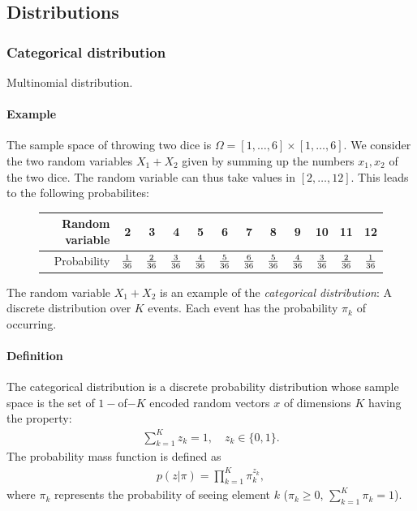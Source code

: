 \subsection{Distributions}
\subsubsection{Categorical distribution}
Multinomial distribution.
\paragraph{Example}
The sample space of throwing two dice is $\Omega = [1,\ldots,6]\times [1,\ldots, 6]$. We consider the two random variables $X_1+X_2$ given by summing up the numbers $x_1, x_2$ of the two dice. The random variable can thus take values in $[2,\ldots, 12]$. This leads to the following probabilites:
\begin{figure}[H]
    \centering
    \begin{tabular}{r|ccccc ccccc c}
        Random variable &2&3&4&5&6&7&8&9&10&11&12\\\hline
        Probability & ${1\over 36}$& ${2\over 36}$& ${3\over 36}$&  ${4\over 36}$& ${5\over 36}$&  ${6\over 36}$& ${5\over 36}$& ${4\over 36}$& ${3\over 36}$& ${2\over 36}$&  ${1\over 36}$
    \end{tabular}
\end{figure}
The random variable $X_1+X_2$ is an example of the \emph{categorical distribution}: A discrete distribution over $K$ events. Each event has the probability $\pi_k$ of occurring.

\paragraph{Definition}
The categorical distribution is a discrete probability distribution whose sample space is the set of $1-$of$-K$ encoded random vectors $x$ of dimensions $K$ having the property:
\begin{align*}
    \sum_{k=1}^K z_k =1, \quad z_k \in \{0,1\}.
\end{align*}
The probability mass function is defined as
\begin{align*}
    p(z| \pi) = \prod_{k=1}^K \pi_k^{z_k},
\end{align*}
where $\pi_k$ represents the probability of seeing element $k$ ($\pi_k \geq 0$, $\sum_{k=1}^K \pi_k =1$).


